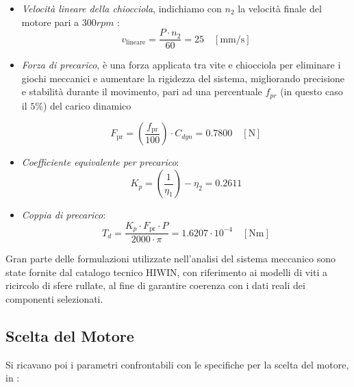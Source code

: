 \documentclass{article}
\begin{document}
\begin{itemize}
    \item \textit{Velocità lineare della chiocciola}, indichiamo con $n_2$ la velocità finale del motore pari a $300 rpm$ : 
    \[
    v_{\text{lineare}} = \frac{P \cdot n_2}{60}=25 \quad [\text{mm/s}]
    \]
    \item \textit{Forza di precarico}, è una forza applicata tra vite e chiocciola per eliminare i giochi meccanici e aumentare la rigidezza del sistema, migliorando precisione e stabilità durante il movimento, pari ad una percentuale $f_{pr}$ (in questo caso il $5\%$) del carico dinamico

    \[
    F_{\text{pr}} = \left( \frac{f_{\text{pr}}}{100} \right) \cdot C_{dyn}=0.7800 \quad [\text{N}]
    \]

    \item \textit{Coefficiente equivalente per precarico}:
    \[
    K_p = \left( \frac{1}{\eta_1} \right) - \eta_2=0.2611
    \]

    \item \textit{Coppia di precarico}:
    \[
    T_d = \frac{K_p \cdot F_{\text{pr}} \cdot P}{2000 \cdot \pi}=1.6207 \cdot10^{-4} \quad [\text{Nm}]
    \]

\end{itemize}

Gran parte delle formulazioni utilizzate nell'analisi del sistema meccanico sono state fornite dal catalogo tecnico HIWIN, con riferimento ai modelli di viti a ricircolo di sfere rullate, al fine di garantire coerenza con i dati reali dei componenti selezionati. 
\vspace{0.5cm}
\subsection{Scelta del Motore}
Si ricavano poi i parametri confrontabili con le specifiche per la scelta del motore, in :
\end{document}
